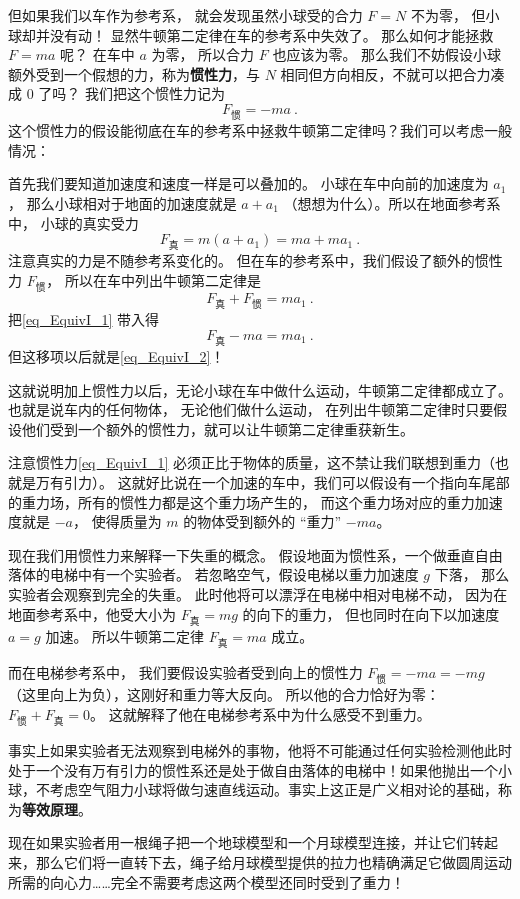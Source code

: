 但如果我们以车作为参考系， 就会发现虽然小球受的合力 $F = N$ 不为零， 但小球却并没有动！ 显然牛顿第二定律在车的参考系中失效了。 那么如何才能拯救 $F = ma$ 呢？ 在车中 $a$ 为零， 所以合力 $F$ 也应该为零。 那么我们不妨假设小球额外受到一个假想的力，称为\textbf{惯性力}，与 $N$ 相同但方向相反，不就可以把合力凑成 0 了吗？ 我们把这个惯性力记为
\begin{equation}\label{eq_EquivI_1}
F_\text{惯} = -ma~.
\end{equation}
这个惯性力的假设能彻底在车的参考系中拯救牛顿第二定律吗？我们可以考虑一般情况：

首先我们要知道加速度和速度一样是可以叠加的。 小球在车中向前的加速度为 $a_1$， 那么小球相对于地面的加速度就是 $a + a_1$ （想想为什么）。所以在地面参考系中， 小球的真实受力
\begin{equation}\label{eq_EquivI_2}
F_\text{真} = m(a + a_1) = ma + ma_1~.
\end{equation}
注意真实的力是不随参考系变化的。 但在车的参考系中，我们假设了额外的惯性力 $F_\text{惯}$， 所以在车中列出牛顿第二定律是
\begin{equation}
F_\text{真} + F_\text{惯} = ma_1~.
\end{equation}
把\autoref{eq_EquivI_1} 带入得
\begin{equation}
F_\text{真} -ma = ma_1~.
\end{equation}
但这移项以后就是\autoref{eq_EquivI_2}！

这就说明加上惯性力以后，无论小球在车中做什么运动，牛顿第二定律都成立了。也就是说车内的任何物体， 无论他们做什么运动， 在列出牛顿第二定律时只要假设他们受到一个额外的惯性力，就可以让牛顿第二定律重获新生。

注意惯性力\autoref{eq_EquivI_1} 必须正比于物体的质量，这不禁让我们联想到重力（也就是万有引力）。 这就好比说在一个加速的车中，我们可以假设有一个指向车尾部的重力场，所有的惯性力都是这个重力场产生的， 而这个重力场对应的重力加速度就是 $-a$， 使得质量为 $m$ 的物体受到额外的 “重力” $-ma$。

现在我们用惯性力来解释一下失重的概念。 假设地面为惯性系，一个做垂直自由落体的电梯中有一个实验者。 若忽略空气，假设电梯以重力加速度 $g$ 下落， 那么实验者会观察到完全的失重。 此时他将可以漂浮在电梯中相对电梯不动， 因为在地面参考系中，他受大小为 $F_\text{真}=mg$ 的向下的重力， 但也同时在向下以加速度 $a = g$ 加速。 所以牛顿第二定律 $F_\text{真}=ma$ 成立。


而在电梯参考系中， 我们要假设实验者受到向上的惯性力 $F_\text{惯} = -ma = -mg$ （这里向上为负），这刚好和重力等大反向。 所以他的合力恰好为零： $F_\text{惯} + F_\text{真} = 0$。 这就解释了他在电梯参考系中为什么感受不到重力。

事实上如果实验者无法观察到电梯外的事物，他将不可能通过任何实验检测他此时处于一个没有万有引力的惯性系还是处于做自由落体的电梯中！如果他抛出一个小球，不考虑空气阻力小球将做匀速直线运动。事实上这正是广义相对论的基础，称为\textbf{等效原理}。

现在如果实验者用一根绳子把一个地球模型和一个月球模型连接，并让它们转起来，那么它们将一直转下去，绳子给月球模型提供的拉力也精确满足它做圆周运动所需的向心力……完全不需要考虑这两个模型还同时受到了重力！


